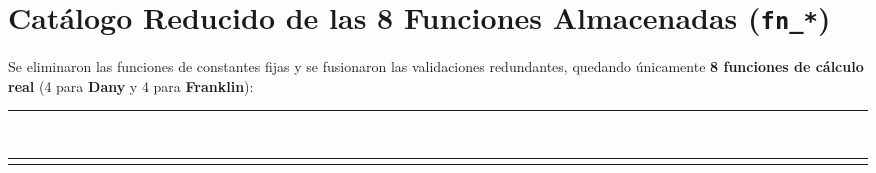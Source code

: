 \documentclass[10pt,a4paper,landscape]{article}
\begin{document}
\newpage

\section{Catálogo Reducido de las 8 Funciones Almacenadas (\texttt{fn\_*})}

Se eliminaron las funciones de constantes fijas y se fusionaron las validaciones redundantes, quedando únicamente \textbf{8 funciones de cálculo real} (4 para \textbf{Dany} y 4 para \textbf{Franklin}):

\footnotesize
\renewcommand{\arraystretch}{1.32}
\begin{longtable}{|p{0.5cm}|p{4.8cm}|p{4.3cm}|p{2.3cm}|p{2.2cm}|p{2.6cm}|p{8.5cm}|}
\hline
\rowcolor{unjbgNavy}
\textcolor{white}{\textbf{N°}} & 
\textcolor{white}{\textbf{Nombre de la Función}} & 
\textcolor{white}{\textbf{Parámetros de Entrada}} & 
\textcolor{white}{\textbf{Retorno}} & 
\textcolor{white}{\textbf{Issue GitHub}} & 
\textcolor{white}{\textbf{Responsable}} & 
\textcolor{white}{\textbf{Qué Hace Exactamente la Función y Qué Fusiona}} \\
\hline
\endfirsthead
\hline
\endlastfoot


\end{longtable}
\end{document}
